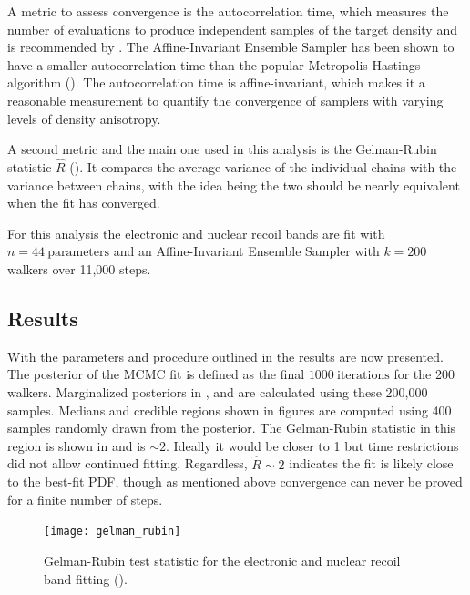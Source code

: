 A metric to assess convergence is the autocorrelation time, which measures the number
of evaluations to produce independent samples of the target density and is recommended by .  The Affine-Invariant
Ensemble Sampler has been shown to have a smaller autocorrelation time than the popular Metropolis-Hastings algorithm
().  The autocorrelation time is affine-invariant, which makes it a reasonable measurement to quantify
the convergence of samplers with varying levels of density anisotropy.

A second metric and the main one used in
this analysis is the Gelman-Rubin statistic $\hat{R}$ ().  It compares the average variance of the individual chains
with the variance between chains, with the idea being the two should be nearly equivalent when the fit has converged.

For this analysis the electronic and nuclear recoil bands are fit with  $n = 44\ \mathrm{parameters}$ and an Affine-Invariant Ensemble
Sampler with $k = 200$ walkers over 11,000 steps.



\subsection{Results}
\label{subsec:er_nr_calibrations_results}
With the parameters and procedure outlined in  the results are now
presented.  The posterior of the MCMC fit is defined as the final $1000\ \mathrm{iterations}$ for the 200 walkers.  Marginalized
posteriors in ,  and
 are calculated using these 200,000 samples.  Medians and credible regions shown in
figures are computed using 400 samples randomly drawn from the posterior.  The Gelman-Rubin statistic in this region is
shown in  and is ${\sim}2$.  Ideally it would be closer to 1 but time restrictions did not allow
continued fitting.  Regardless, $\hat{R} \sim 2$ indicates the fit is likely close to the best-fit PDF, though as mentioned above
convergence can never be proved for a finite number of steps.

\begin{figure}
\centering
\texttt{[image: gelman\_rubin]}
\caption{Gelman-Rubin test statistic for the electronic and nuclear recoil band fitting
().}
\label{fig:er_nr_calibrations_results_gr}
\end{figure}

